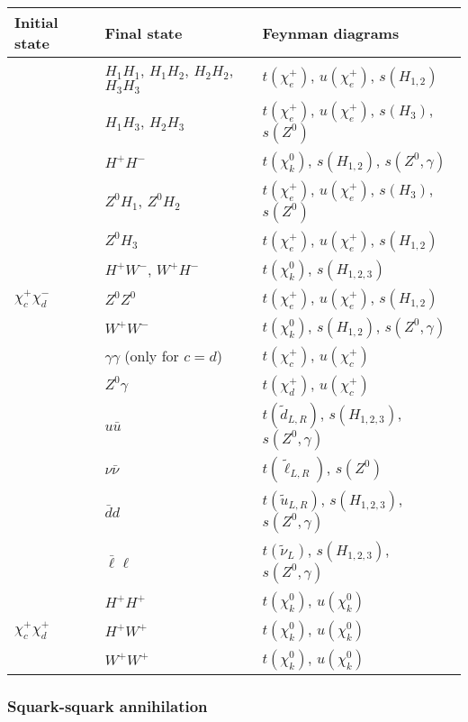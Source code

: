 \begin{center} 
\begin{tabular}{lll} \hline 
  Initial state & Final state & Feynman diagrams \\ \hline \tabspace
   & $H_1 H_1$, $H_1 H_2$, $H_2 H_2$, $H_3 H_3$ &
  $t(\chi_e^+)$, $u(\chi_e^+)$, $s(H_{1,2})$ \\
   & $H_1 H_3$, $H_2 H_3$ &
  $t(\chi_e^+)$, $u(\chi_e^+)$, $s(H_{3})$, $s(Z^0)$ \\
   & $H^+ H^-$ &
  $t(\chi_k^0)$, $s(H_{1,2})$, $s(Z^0,\gamma)$ \\
   & $Z^0 H_1$, $Z^0 H_2$ &
  $t(\chi_e^+)$, $u(\chi_e^+)$, $s(H_{3})$, $s(Z^0)$ \\
   & $Z^0 H_3$ &
  $t(\chi_e^+)$, $u(\chi_e^+)$, $s(H_{1,2})$ \\
   & $H^+ W^-$, $W^+ H^-$ &
  $t(\chi_k^0)$, $s(H_{1,2,3})$ \\
  $\chi_c^+ \chi_d^-$ & $Z^0 Z^0$ &
  $t(\chi_e^+)$, $u(\chi_e^+)$, $s(H_{1,2})$ \\
   & $W^+ W^-$ &
  $t(\chi_k^0)$, $s(H_{1,2})$, $s(Z^0, \gamma)$ \\
   & $\gamma \gamma$ (only for $c=d$) &
  $t(\chi_c^+)$, $u(\chi_c^+)$ \\
   & $Z^0 \gamma$ &
  $t(\chi_d^+)$, $u(\chi_c^+)$ \\
   & $u \bar{u}$ &
  $t(\tilde{d}_{L,R})$, $s(H_{1,2,3})$, $s(Z^0, \gamma)$ \\
   & $\nu \bar{\nu}$ &
  $t(\tilde{\ell}_{L,R})$, $s(Z^0)$ \\
   & $\bar{d} d$ &
  $t(\tilde{u}_{L,R})$, $s(H_{1,2,3})$, $s(Z^0, \gamma)$ \\
   & $\bar{\ell} \ell$ &
  $t(\tilde{\nu}_{L})$, $s(H_{1,2,3})$, $s(Z^0, \gamma)$ \\ \hline
   & $H^+ H^+$ &
  $t(\chi_k^0)$, $u(\chi_k^0)$ \\
  $\chi_c^+ \chi_d^+$ & $H^+ W^+$ &
  $t(\chi_k^0)$, $u(\chi_k^0)$ \\
   & $W^+ W^+$ &
  $t(\chi_k^0)$, $u(\chi_k^0)$ \\ \hline
\end{tabular}
\end{center}


\subsubsection{Squark-squark annihilation}

